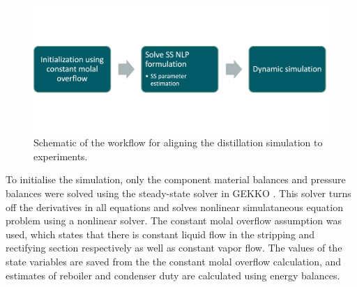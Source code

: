 \begin{figure}
    \centering
    \includegraphics[width=\textwidth]{gfx/Chapter06/simulation_workflow.png}
    \caption{Schematic of the workflow for aligning the distillation simulation to experiments.}
    \label{fig:simulation_workflow}
\end{figure}

To initialise  the simulation, only the component material balances and pressure balances were solved using the steady-state solver in GEKKO \cite{Beal2018}. This solver turns off the derivatives in all equations and solves nonlinear simulataneous equation problem using a nonlinear solver. The constant molal overflow assumption was used, which states that there is constant liquid flow in the stripping and rectifying section respectively as well as constant vapor flow.  The values of the state variables are saved from the the constant molal overflow calculation, and estimates of reboiler and condenser duty are calculated using energy balances.

